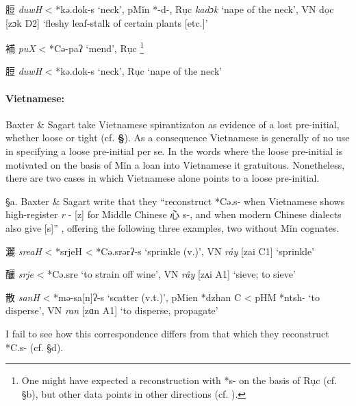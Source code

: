\begin{description} \item
脰 \emph{duwH} \textless{} *kə.d{}ok-s `neck', pMǐn *-d-, Rục
 \emph{kadɔk} `nape of the neck', VN dọc {[}zɔk D2] `fleshy leaf-stalk
of certain plants {[}etc.]'
\item
補 \emph{puX} \textless{} *Cə-p{}aʔ `mend', Rục \emph{} \footnote{One
  might have expected a reconstruction with *s- on the basis of Rục (cf.
  §b), but other data points in other directions (cf. \cite[187]{Baxter2014OldChinese}).}
\item
脰 \emph{duwH} \textless{} *kə.d{}ok-s `neck', Rục \emph{} `nape of
the neck'
\end{description}

\paragraph{Vietnamese:} Baxter \& Sagart take
Vietnamese spirantizaton as evidence of a lost pre-initial, whether
loose or tight (cf. \textbf{§}). As a consequence Vietnamese is
generally of no use in specifying a loose pre-initial per se. In the
words where the loose pre-initial is motivated on the basis of Mǐn a
loan into Vietnamese it gratuitous. Nonetheless, there are two cases in
which Vietnamese alone points to a loose pre-initial.

§a. Baxter \& Sagart write that they ``reconstruct *Cə.s- when
Vietnamese shows high-register \emph{r} - {[}z] for Middle Chinese 心
s-, and when modern Chinese dialects also give {[}s]'' 
\citeyearpar[187]{Baxter2014OldChinese},
offering the following three examples, two without Mǐn cognates.

\begin{description} \item
灑  \emph{sreaH} \textless{} *srjeH \textless{} *Cə.srərʔ-s `sprinkle
(v.)', VN \emph{rảy} {[}zai C1] `sprinkle'
\item
釃 \emph{srje} \textless{} *Cə.sre `to strain off wine', VN \emph{rây}
{[}zʌi A1] `sieve; to sieve'
\item
散 \emph{sanH} \textless{} *mə-s{}a[n]ʔ-s `scatter (v.t.)', pMien
*dzhan C \textless{} pHM *ntsh- `to disperse', VN \emph{ran} {[}zɑn
A1] `to disperse, propagate'
\end{description}

I fail to see how this correspondence differs from that which they
reconstruct *C.s- (cf. §d).

